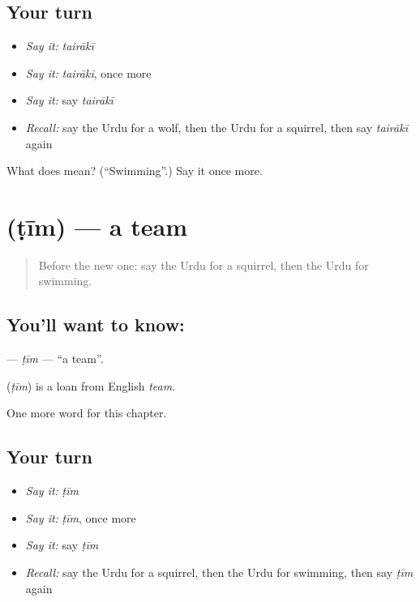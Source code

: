 \subsection*{Your turn}
\begin{itemize}
\raggedright
  \item \emph{Say it:} \emph{tairākī}
  \item \emph{Say it:} \emph{tairākī}, once more
  \item \emph{Say it:} say \emph{tairākī}
  \item \emph{Recall:} say the Urdu for a wolf, then the Urdu for a squirrel, then say \emph{tairākī} again
\end{itemize}

\begin{tcolorbox}[breakable,colback=teal!4,colframe=teal!35!black,title={Before you move on}]
What does  mean? (\textquotedblleft{}Swimming\textquotedblright{}.) Say it once more.
\end{tcolorbox}
\section[\texorpdfstring{\ur{ٹیم} (ṭīm)}{ٹیم (ṭīm)}]{ (ṭīm) — a team}

\label{lesson:UR-C228-tim}



\begin{quote}
Before the new one: say the Urdu for a squirrel, then the Urdu for swimming.
\end{quote}

\subsection*{You'll want to know: }
\textbf{} — \emph{ṭīm} — \textquotedblleft{}a team\textquotedblright{}.

\begin{cousinweb}
\textbf{} (\emph{ṭīm}) is a loan from English \emph{team}.
\end{cousinweb}

\begin{grammarlens}[title={What you've built}]
One more word for this chapter.
\end{grammarlens}

\subsection*{Your turn}
\begin{itemize}
\raggedright
  \item \emph{Say it:} \emph{ṭīm}
  \item \emph{Say it:} \emph{ṭīm}, once more
  \item \emph{Say it:} say \emph{ṭīm}
  \item \emph{Recall:} say the Urdu for a squirrel, then the Urdu for swimming, then say \emph{ṭīm} again
\end{itemize}

